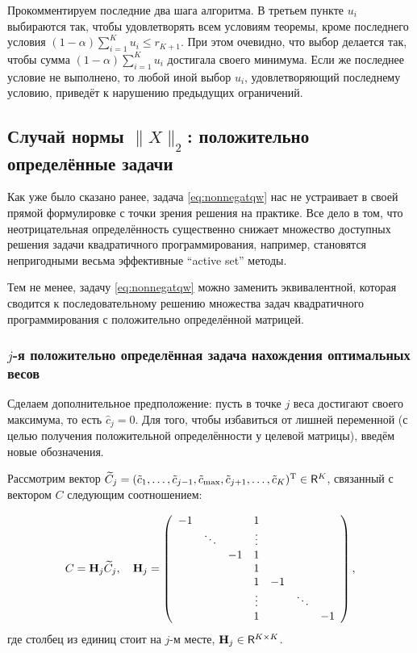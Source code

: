 \documentclass[12pt,a4paper]{article}
\begin{document}
	Прокомментируем последние два шага алгоритма. В третьем пункте $u_i$ выбираются так, чтобы удовлетворять всем условиям теоремы, кроме последнего условия $(1 - \alpha) \sum_{i=1}^K u_i \le r_{K+1}$. При этом очевидно, что выбор делается так, чтобы сумма $(1 - \alpha) \sum_{i=1}^K u_i$ достигала своего минимума. Если же последнее условие не выполнено, то любой иной выбор $u_i$, удовлетворяющий последнему условию, приведёт к нарушению предыдущих ограничений.

\subsection{Случай нормы $\|X\|_2$: положительно определённые задачи}
Как уже было сказано ранее, задача \eqref{eq:nonnegatqw} нас не устраивает в своей прямой формулировке с точки зрения решения на практике. Все дело в том, что неотрицательная определённость существенно снижает множество доступных  решения задачи квадратичного программирования, например, становятся непригодными весьма эффективные ``active set'' методы.

Тем не менее, задачу \eqref{eq:nonnegatqw} можно заменить эквивалентной, которая сводится к последовательному решению множества задач квадратичного программирования с положительно определённой матрицей.
\subsubsection{$j$-я положительно определённая задача нахождения оптимальных весов}
Сделаем дополнительное предположение: пусть в точке $j$ веса достигают своего максимума, то есть $\hat c_j = 0$. Для того, чтобы избавиться от лишней переменной (с целью получения положительной определённости у целевой матрицы), введём новые обозначения.

Рассмотрим вектор $\widetilde C_j = (\tilde c_1, \ldots, \tilde c_{j-1}, \tilde c_\text{max}, \tilde c_{j+1}, \ldots, \tilde c_K)^{\mathrm{T}} \in \mathsf{R}^K$, связанный с вектором $C$ следующим соотношением:

\begin{equation} \label{eq:h_jmatrix} C = \mathbf{H}_j \widetilde C_j, \quad
\mathbf{H}_j = \left(
\begin{array}{ccccccc}
-1 &  &  & 1 &  &  &  \\ 
& \ddots &  & \vdots &  &  &  \\ 
&  & -1 & 1 &  &  &  \\ 
&  &  & 1 &  &  &  \\ 
&  &  & 1 & -1 &  &  \\ 
&  &  & \vdots &  & \ddots &  \\ 
&  &  & 1 &  &  & -1
\end{array} 
\right),
\end{equation}
где столбец из единиц стоит на $j$-м месте, $\mathbf{H}_j \in \mathsf{R}^{K \times K}$.
\end{document}
